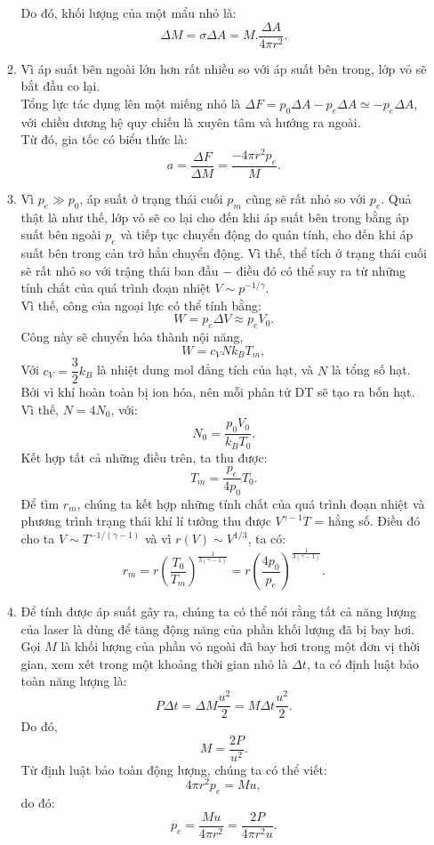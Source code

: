 \begin{loigiai}
\begin{enumerate}
\begin{enumerate}[1)]
Do đó, khối lượng của một mẩu nhỏ là:
\[\Delta M=\sigma \Delta A=M.\dfrac{\Delta A}{4\pi r^2}.\]
    \item Vì áp suất bên ngoài lớn hơn rất nhiều so với áp suất bên trong, lớp vỏ sẽ bắt đầu co lại.\\
Tổng lực tác dụng lên một miếng nhỏ là $\Delta F=p_0\Delta A-p_{e}\Delta A\simeq-p_{e}\Delta A$, với chiều dương hệ quy chiếu là xuyên tâm và hướng ra ngoài.\\
Từ đó, gia tốc có biểu thức là:
\[a=\dfrac{\Delta F}{\Delta M}=\dfrac{-4\pi r^2p_{e}}{M}.\]
     \item Vì $p_{e}\gg p_0$, áp suất ở trạng thái cuối $p_{m}$ cũng sẽ rất nhỏ so với $p_{e}$. Quả thật là như thế, lớp vỏ sẽ co lại cho đến khi áp suất bên trong bằng áp suất bên ngoài $p_{e}$ và tiếp tục chuyển động do quán tính, cho đến khi áp suất bên trong cản trở hẳn chuyển động. Vì thế, thể tích ở trạng thái cuối sẽ rất nhỏ so với trậng thái ban đầu $-$ điều đó có thể suy ra từ những tính chất của quá trình đoạn nhiệt $V \sim  p^{-1/\gamma}$.\\
Vì thế, công của ngoại lực có thể tính bằng:
\[W=p_{e}\Delta V \approx p_e V_0.\]
Công này sẽ chuyển hóa thành nội năng,
\[W=c_{V}Nk_{B}T_{m},\]
Với $c_{V}=\dfrac{3}{2}k_{B}$ là nhiệt dung mol đẳng tích của hạt, và $N$ là tổng số hạt.\\
Bởi vì khí hoàn toàn bị ion hóa, nên mỗi phân tử DT sẽ tạo ra bốn hạt.\\
Vì thế, $N=4N_0$, với:
\[N_0=\dfrac{p_0V_0}{k_{B}T_0}.\]
Kết hợp tất cả những điều trên, ta thu được:
\[T_{m}=\dfrac{p_{e}}{4p_0}T_0.\]
Để tìm $r_{m}$, chúng ta kết hợp những tính chất của quá trình đoạn nhiệt và phương trình trạng thái khí lí tưởng thu được $V^{\gamma-1}T$ = hằng số. Điều đó cho ta $V \sim T^{-1/(\gamma-1)}$ và vì $r(V) \sim V^{1/3}$, ta có:
\[r_{m}=r\left(\dfrac{T_0}{T_{m}}\right)^{\frac{1}{3(\gamma-1)}}=r\left(\dfrac{4p_0}{p_{e}}\right)^{\frac{1}{3(\gamma-1)}}.\]
     \item Để tính được áp suất gây ra, chúng ta có thể nói rằng tất cả năng lượng của laser là dùng để tăng động năng của phần khối lượng đã bị bay hơi.\\
Gọi $M$ là khối lượng của phần vỏ ngoài đã bay hơi trong một đơn vị thời gian, xem xét trong một khoảng thời gian nhỏ là $\Delta t$, ta có định luật bảo toàn năng lượng là:
\[P\Delta t=\Delta M\dfrac{u^2}{2}=M\Delta t\dfrac{u^2}{2}.\]
Do đó,
\[M=\dfrac{2P}{u^2}.\]
Từ định luật bảo toàn động lượng, chúng ta có thể viết:
\[4\pi r^2 p_{e}=Mu,\]
do đó:
\[p_{e}=\dfrac{Mu}{4\pi r^2}=\dfrac{2P}{4\pi r^2u}.\]
\end{enumerate}
\end{enumerate}
\end{loigiai}


